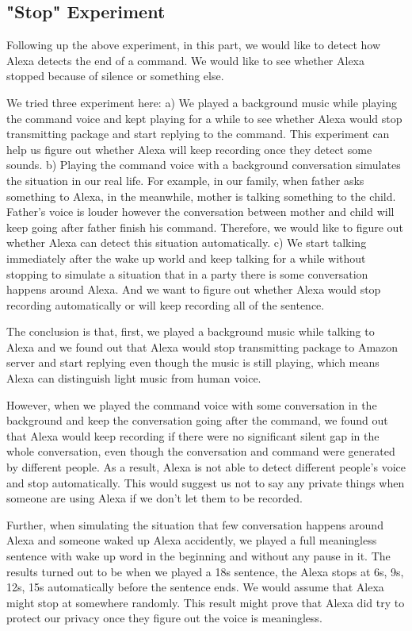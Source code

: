 \subsection{"Stop" Experiment}

Following up the above experiment, in this part, we would like to detect how Alexa detects the end of a command. We would like to see whether Alexa stopped because of silence or something else.

We tried three experiment here: a) We played a background music while playing the command voice and kept playing for a while to see whether Alexa would stop transmitting package and start replying to the command. This experiment can help us figure out whether Alexa will keep recording once they detect some sounds. b) Playing the command voice with a background conversation simulates the situation in our real life. For example, in our family, when father asks something to Alexa, in the meanwhile, mother is talking something to the child. Father's voice is louder however the conversation between mother and child will keep going after father finish his command. Therefore, we would like to figure out whether Alexa can detect this situation automatically. c) We start talking immediately after the wake up world and keep talking for a while without stopping to simulate a situation that in a party there is some conversation happens around Alexa. And we want to figure out whether Alexa would stop recording automatically or will keep recording all of the sentence.

The conclusion is that, first, we played a background music while talking to Alexa and we found out that Alexa would stop transmitting package to Amazon server and start replying even though the music is still playing, which means Alexa can distinguish light music from human voice.

However, when we played the command voice with some conversation in the background and keep the conversation going after the command, we found out that Alexa would keep recording if there were no significant silent gap in the whole conversation, even though the conversation and command were generated by different people. As a result, Alexa is not able to detect different people's voice and stop automatically. This would suggest us not to say any private things when someone are using Alexa if we don't let them to be recorded. 

Further, when simulating the situation that few conversation happens around Alexa and someone waked up Alexa accidently, we played a full meaningless sentence with wake up word in the beginning and without any pause in it. The results turned out to be when we played a 18s sentence, the Alexa stops at 6s, 9s, 12s, 15s automatically before the sentence ends. We would assume that Alexa might stop at somewhere randomly. This result might prove that Alexa did try to protect our privacy once they figure out the voice is meaningless.


